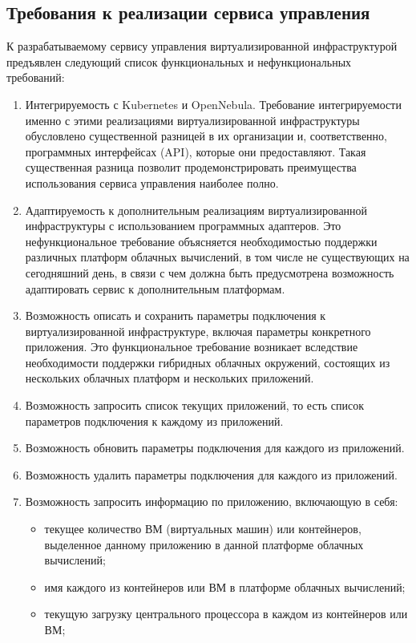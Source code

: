 \subsection{Требования к реализации сервиса управления}
\label{requirements}
К разрабатываемому сервису управления виртуализированной инфраструктурой предъявлен следующий список функциональных и нефункциональных требований:
\begin{enumerate}
    \item Интегрируемость с Kubernetes и OpenNebula.
    Требование интегрируемости именно с этими реализациями виртуализированной инфраструктуры обусловлено существенной разницей в их организации и, соответственно, программных интерфейсах (API), которые они предоставляют.
    Такая существенная разница позволит продемонстрировать преимущества использования сервиса управления наиболее полно.
    \item Адаптируемость к дополнительным реализациям виртуализированной инфраструктуры с использованием программных адаптеров.
    Это нефункциональное требование объясняется необходимостью поддержки различных платформ облачных вычислений, в том числе не существующих на сегодняшний день, в связи с чем должна быть предусмотрена возможность адаптировать сервис к дополнительным платформам. 
    \item Возможность описать и сохранить параметры подключения к виртуализированной инфраструктуре, включая параметры конкретного приложения.
    Это функциональное требование возникает вследствие необходимости поддержки гибридных облачных окружений, состоящих из нескольких облачных платформ и нескольких приложений.
    \item Возможность запросить список текущих приложений, то есть список параметров подключения к каждому из приложений. 
    \item Возможность обновить параметры подключения для каждого из приложений.
    \item Возможность удалить параметры подключения для каждого из приложений.
    \item Возможность запросить информацию по приложению, включающую в себя:
    \begin{itemize}
        \item текущее количество ВМ (виртуальных машин) или контейнеров, выделенное данному приложению в данной платформе облачных вычислений;
        \item имя каждого из контейнеров или ВМ в платформе облачных вычислений;
        \item текущую загрузку центрального процессора в каждом из контейнеров или ВМ;

\end{itemize}
\end{enumerate}
